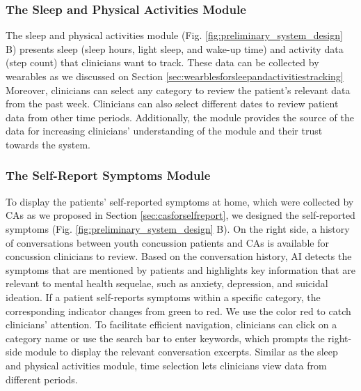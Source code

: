 \subsubsection{The Sleep and Physical Activities Module}
The sleep and physical activities module (Fig. \ref{fig:preliminary_system_design} B)  presents sleep (sleep hours, light sleep, and wake-up time) and activity data (step count) that clinicians want to track.
These data can be collected by wearables as we discussed on Section \ref{sec:wearblesforsleepandactivitiestracking}
Moreover, clinicians can select any category to review the patient’s relevant data from the past week. 
Clinicians can also select different dates to review patient data from other time periods. 
Additionally, the module provides the source of the data for increasing clinicians' understanding of the module and their trust towards the system. 


\subsubsection{The Self-Report Symptoms Module}
To display the patients' self-reported symptoms at home, which were collected by CAs as we proposed in Section \ref{sec:casforselfreport}, we designed the self-reported symptoms (Fig. \ref{fig:preliminary_system_design} B). 
On the right side, a history of conversations between youth concussion patients and CAs is available for concussion clinicians to review. 
Based on the conversation history, AI detects the symptoms that are mentioned by patients and highlights key information that are relevant to mental health sequelae, such as anxiety, depression, and suicidal ideation. 
If a patient self-reports symptoms within a specific category, the corresponding indicator changes from green to red.
We use the color red to catch clinicians' attention. 
To facilitate efficient navigation, clinicians can click on a category name or use the search bar to enter keywords, which prompts the right-side module to display the relevant conversation excerpts. 
Similar as the sleep and physical activities module, time selection lets clinicians view data from different periods.


